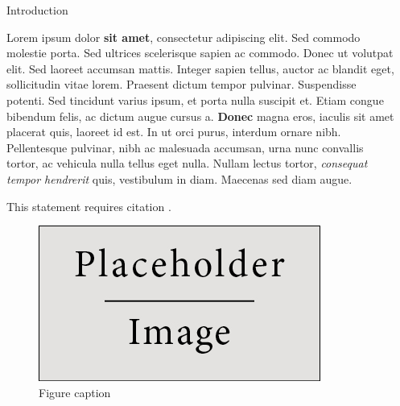 \documentclass[final]{beamer}
\newlength{\sepwid}
\newlength{\onecolwid}
\begin{document}
\begin{frame}[t]
\begin{columns}[t]
\begin{column}{\onecolwid}

\begin{block}{Introduction}

Lorem ipsum dolor \textbf{sit amet}, consectetur adipiscing elit. Sed commodo molestie porta. Sed ultrices scelerisque sapien ac commodo. Donec ut volutpat elit. Sed laoreet accumsan mattis. Integer sapien tellus, auctor ac blandit eget, sollicitudin vitae lorem. Praesent dictum tempor pulvinar. Suspendisse potenti. Sed tincidunt varius ipsum, et porta nulla suscipit et. Etiam congue bibendum felis, ac dictum augue cursus a. \textbf{Donec} magna eros, iaculis sit amet placerat quis, laoreet id est. In ut orci purus, interdum ornare nibh. Pellentesque pulvinar, nibh ac malesuada accumsan, urna nunc convallis tortor, ac vehicula nulla tellus eget nulla. Nullam lectus tortor, \textit{consequat tempor hendrerit} quis, vestibulum in diam. Maecenas sed diam augue.

This statement requires citation \cite{Smith:2012qr}.

\end{block}


\begin{figure}
\includegraphics[width=0.8\linewidth]{source/placeholder.jpg}
\caption{Figure caption}
\end{figure}


\end{column} %

\begin{column}{\sepwid}\end{column} %


\end{columns}
\end{frame}
\end{document}
